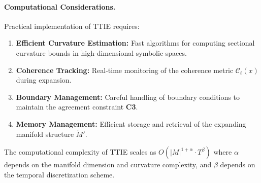 \paragraph{Computational Considerations.}
Practical implementation of TTIE requires:
\begin{enumerate}
\item \textbf{Efficient Curvature Estimation:} Fast algorithms for computing sectional curvature bounds in high-dimensional symbolic spaces.
\item \textbf{Coherence Tracking:} Real-time monitoring of the coherence metric $\mathcal{C}_t(x)$ during expansion.
\item \textbf{Boundary Management:} Careful handling of boundary conditions to maintain the agreement constraint \textbf{C3}.
\item \textbf{Memory Management:} Efficient storage and retrieval of the expanding manifold structure $\widetilde{M}'$.
\end{enumerate}

The computational complexity of TTIE scales as $O(|M|^{1+\alpha} \cdot T^{\beta})$ where $\alpha$ depends on the manifold dimension and curvature complexity, and $\beta$ depends on the temporal discretization scheme.

